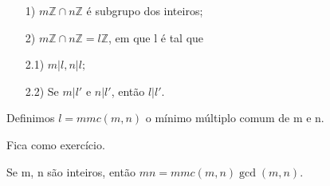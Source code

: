\documentclass[algebra_notes.tex]{subfiles}
\begin{document}
\begin{prop*}
	\begin{itemize}
		\item[1)] $m \mathbb{Z}\cap n \mathbb{Z}$ é subgrupo dos inteiros;
		\item[2)] $m \mathbb{Z}\cap n \mathbb{Z} = l \mathbb{Z}$, em que l é tal que
		\item[2.1)] $m | l, n | l;$
		\item[2.2)] Se $m | l'$ e $n | l'$, então $l | l'.$
	\end{itemize}
	Definimos $l = mmc(m, n)$ o mínimo múltiplo comum de m e n.
\end{prop*}
\begin{proof*}
	Fica como exercício.
\end{proof*}
\begin{crl*}
	Se m, n são inteiros, então $mn = mmc(m, n)\gcd{(m, n)}$.
\end{crl*}
\end{document}
